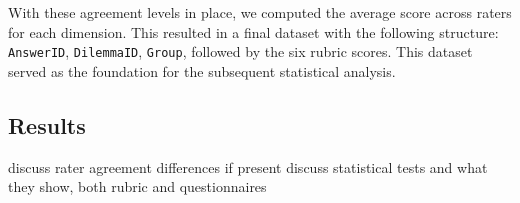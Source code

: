 With these agreement levels in place, we computed the average score across raters for each dimension. This resulted in a final dataset with the following structure: \texttt{AnswerID}, \texttt{DilemmaID}, \texttt{Group}, followed by the six rubric scores. This dataset served as the foundation for the subsequent statistical analysis.

\subsection{Results}

discuss rater agreement differences if present
discuss statistical tests and what they show, both rubric and questionnaires
